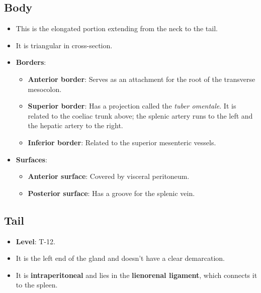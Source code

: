 \documentclass[11pt, a4paper]{article}
\begin{document}
\subsection{Body}
\begin{itemize}
    \item This is the elongated portion extending from the neck to the tail.
    \item It is triangular in cross-section.
    \item \textbf{Borders}:
    \begin{itemize}
        \item \textbf{Anterior border}: Serves as an attachment for the root of the transverse mesocolon.
        \item \textbf{Superior border}: Has a projection called the \textit{tuber omentale}. It is related to the coeliac trunk above; the splenic artery runs to the left and the hepatic artery to the right.
        \item \textbf{Inferior border}: Related to the superior mesenteric vessels.
    \end{itemize}
    \item \textbf{Surfaces}:
    \begin{itemize}
        \item \textbf{Anterior surface}: Covered by visceral peritoneum.
        \item \textbf{Posterior surface}: Has a groove for the splenic vein.
    \end{itemize}
\end{itemize}

\subsection{Tail}
\begin{itemize}
    \item \textbf{Level}: T-12.
    \item It is the left end of the gland and doesn't have a clear demarcation.
    \item It is \textbf{intraperitoneal} and lies in the \textbf{lienorenal ligament}, which connects it to the spleen.
\end{itemize}
\end{document}
